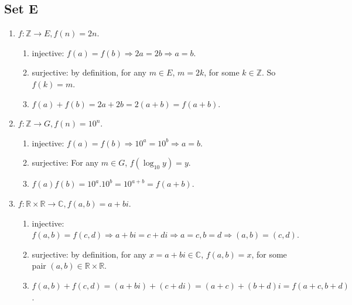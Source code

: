 \documentclass{article}
\begin{document}
\subsection{Set E}
\begin{enumerate}
    \item $ f: \mathbb{Z} \to E, f(n) = 2n $.
        \begin{enumerate}
    
            \item injective: $ f(a) = f(b) \Rightarrow 2a = 2b \Rightarrow a = b $.
    
            \item surjective: by definition, for any $ m \in E $, $ m = 2k $, for some $ k \in \mathbb{Z} $. So $ f(k) = m $.
    
            \item $ f(a) + f(b) = 2a + 2b = 2(a + b) = f(a + b) $.
        \end{enumerate}
    
    \item $ f: \mathbb{Z} \to G, f(n) = 10^n $.
        \begin{enumerate}
    
            \item injective: $ f(a) = f(b) \Rightarrow 10^a = 10^b \Rightarrow a = b $.
    
            \item surjective: For any $ m \in G $, $ f(\log_{10} y) = y $.
    
            \item $ f(a)f(b) = 10^a.10^b = 10^{a + b} = f(a + b) $.
        \end{enumerate}
    
    \item $ f: \mathbb{R} \times \mathbb{R} \to \mathbb{C}, f(a, b) = a + bi $.
        \begin{enumerate}
            \item injective: $ f(a, b) = f(c, d) \Rightarrow a + bi = c + di \Rightarrow a = c, b = d \Rightarrow (a, b) = (c, d) $.

            \item surjective: by definition, for any $ x = a + bi \in \mathbb{C} $, $ f(a, b) = x $, for some pair $ (a, b) \in \mathbb{R} \times \mathbb{R}$.

            \item $ f(a, b) + f(c, d) = (a + bi) + (c + di) = (a + c) + (b + d)i = f(a + c, b + d) $.
        \end{enumerate}


\end{enumerate}
\end{document}
